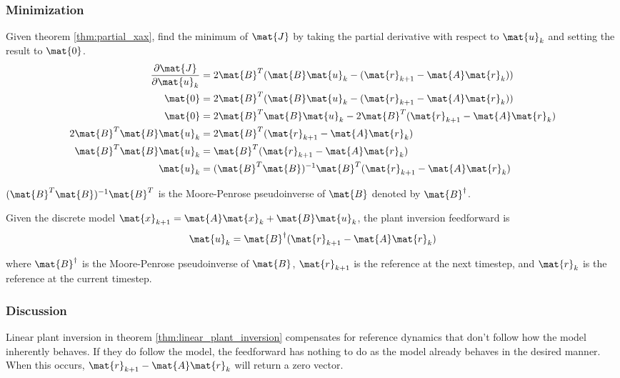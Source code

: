 \subsubsection{Minimization}

Given theorem \ref{thm:partial_xax}, find the minimum of $\mat{J}$ by taking the
partial derivative with respect to $\mat{u}_k$ and setting the result to
$\mat{0}$.
\begin{align*}
  \frac{\partial\mat{J}}{\partial\mat{u}_k} &= 2\mat{B}^T
    (\mat{B}\mat{u}_k - (\mat{r}_{k+1} - \mat{A}\mat{r}_k)) \\
  \mat{0} &= 2\mat{B}^T
    (\mat{B}\mat{u}_k - (\mat{r}_{k+1} - \mat{A}\mat{r}_k)) \\
  \mat{0} &= 2\mat{B}^T\mat{B}\mat{u}_k -
    2\mat{B}^T(\mat{r}_{k+1} - \mat{A}\mat{r}_k) \\
  2\mat{B}^T\mat{B}\mat{u}_k &=
    2\mat{B}^T(\mat{r}_{k+1} - \mat{A}\mat{r}_k) \\
  \mat{B}^T\mat{B}\mat{u}_k &=
    \mat{B}^T(\mat{r}_{k+1} - \mat{A}\mat{r}_k) \\
  \mat{u}_k &=
    (\mat{B}^T\mat{B})^{-1} \mat{B}^T(\mat{r}_{k+1} - \mat{A}\mat{r}_k)
\end{align*}

$(\mat{B}^T\mat{B})^{-1} \mat{B}^T$ is the Moore-Penrose pseudoinverse of
$\mat{B}$ denoted by $\mat{B}^\dagger$.
\begin{theorem}
  \label{thm:linear_plant_inversion}

  Given the discrete model
  $\mat{x}_{k+1} = \mat{A}\mat{x}_k + \mat{B}\mat{u}_k$, the plant inversion
  feedforward is
  \begin{equation}
    \mat{u}_k = \mat{B}^\dagger (\mat{r}_{k+1} - \mat{A}\mat{r}_k)
  \end{equation}

  where $\mat{B}^\dagger$ is the Moore-Penrose pseudoinverse of $\mat{B}$,
  $\mat{r}_{k+1}$ is the reference at the next timestep, and $\mat{r}_k$ is the
  reference at the current timestep.
\end{theorem}

\subsubsection{Discussion}

Linear \gls{plant} inversion in theorem \ref{thm:linear_plant_inversion}
compensates for \gls{reference} dynamics that don't follow how the \gls{model}
inherently behaves. If they do follow the \gls{model}, the feedforward has
nothing to do as the \gls{model} already behaves in the desired manner. When
this occurs, $\mat{r}_{k+1} - \mat{A}\mat{r}_k$ will return a zero vector.

